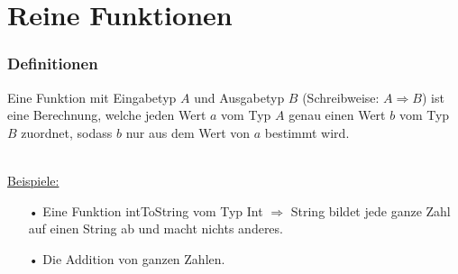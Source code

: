 	\section[Section]{Reine Funktionen}
	\begin{frame}
		\frametitle{Definitionen}
		\begin{defe}
			Eine Funktion mit Eingabetyp $A$ und Ausgabetyp $B$ (Schreibweise: $A				\Rightarrow B$)
			ist eine Berechnung, welche jeden Wert $a$ vom Typ $A$ genau einen Wert 			$b$ vom Typ $B$ zuordnet, sodass $b$ nur aus dem Wert von $a$ bestimmt 				wird.
		\end{defe} 
		\leavevmode \\
		\underline{Beispiele:}
		\begin{itemize}
		\item[•] Eine Funktion intToString vom Typ Int $\Rightarrow$ String bildet 
		jede ganze Zahl auf einen String ab und macht nichts anderes.
		\item[•] Die Addition von ganzen Zahlen. 
		\end{itemize}
	\end{frame}
	